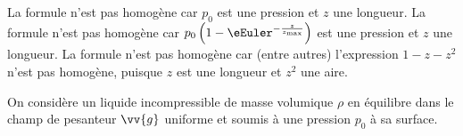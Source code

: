 \reponse{\reponseC{}}

\begin{corrige}
La formule \reponseA{} n'est pas homogène car $p_0$ est une pression et $z$ une longueur. 
La formule \reponseB{} n'est pas homogène car $p_0\left (1-\eEuler^{-\frac{z}{z_{\text{max}}}}\right )$ est une pression et $z$ une longueur. 
La formule \reponseD{} n'est pas homogène car (entre autres) l'expression $1-z-z^2$ n'est pas homogène, puisque $z$ est une longueur et $z^2$ une aire.
\end{corrige}




\finEntrainement




\newpage





\hauteurLargeurCadreReponse		{8mm}{3cm}
\initialisationEntrainement

                                \initialisationPartieGauche %
On considère un liquide incompressible de masse volumique $\rho$ en équilibre dans le champ de pesanteur $\vv{g}$ uniforme et soumis à une pression $p_0$ à sa surface.
	
